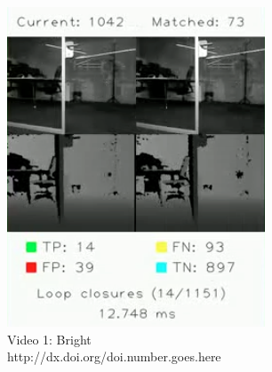\documentclass[]{spie}  %
\begin{document}
\begin{figure}
        \centering
        
        
        \begin{subfigure}[b]{0.32\textwidth}
        \centering
        \includegraphics[trim = 0mm 0mm 0mm 0mm, clip, width=\textwidth]{figures/video_bright.png}    
        \caption{Video 1: Bright\vspace{1mm}\\\scriptsize{http://dx.doi.org/doi.number.goes.here}}
        \label{subfig:video_bright}
        \end{subfigure}
        ~ 
        \begin{subfigure}[b]{0.32\textwidth}
        \centering

\end{subfigure}
\end{figure}
\end{document}
